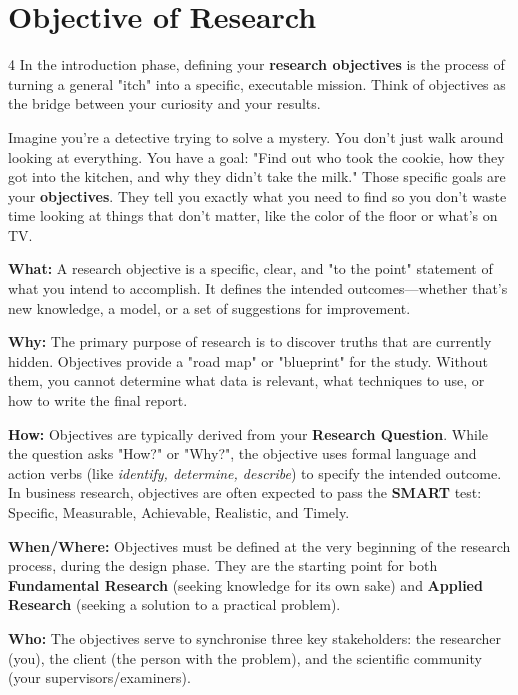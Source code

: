 \documentclass{report}
\begin{document}
\section{Objective of Research}

4
In the introduction phase, defining your \textbf{research objectives} is the process of turning a general "itch" into a specific, executable mission. Think of objectives as the bridge between your curiosity and your results.

\begin{layerELI5}
    Imagine you're a detective trying to solve a mystery. You don't just walk around looking at everything. You have a goal: "Find out who took the cookie, how they got into the kitchen, and why they didn't take the milk." Those specific goals are your \textbf{objectives}. They tell you exactly what you need to find so you don't waste time looking at things that don't matter, like the color of the floor or what's on TV.
\end{layerELI5}

\begin{layerReal}
    \textbf{What:} A research objective is a specific, clear, and "to the point" statement of what you intend to accomplish. It defines the intended outcomes—whether that's new knowledge, a model, or a set of suggestions for improvement.
    
    
    \textbf{Why:} The primary purpose of research is to discover truths that are currently hidden. Objectives provide a "road map" or "blueprint" for the study. Without them, you cannot determine what data is relevant, what techniques to use, or how to write the final report.
    
    
    \textbf{How:} Objectives are typically derived from your \textbf{Research Question}. While the question asks "How?" or "Why?", the objective uses formal language and action verbs (like \textit{identify, determine, describe}) to specify the intended outcome. In business research, objectives are often expected to pass the \textbf{SMART} test: Specific, Measurable, Achievable, Realistic, and Timely.
    
    
    \textbf{When/Where:} Objectives must be defined at the very beginning of the research process, during the design phase. They are the starting point for both \textbf{Fundamental Research} (seeking knowledge for its own sake) and \textbf{Applied Research} (seeking a solution to a practical problem).
    
    
    \textbf{Who:} The objectives serve to synchronise three key stakeholders: the researcher (you), the client (the person with the problem), and the scientific community (your supervisors/examiners).
\end{layerReal}
\end{document}
